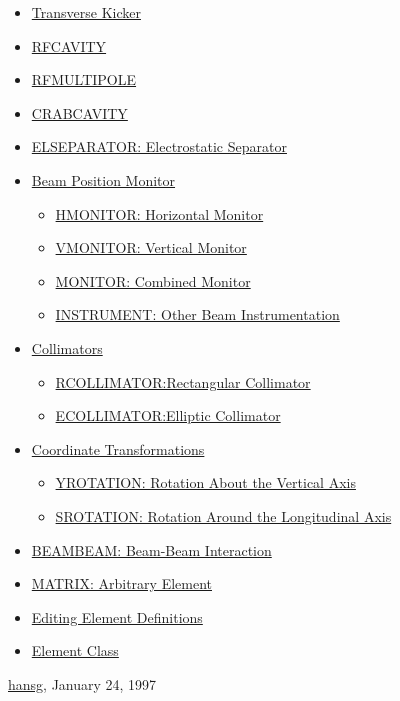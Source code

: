 \begin{itemize}
\begin{itemize}
\end{itemize}
	\item \href{tkickers.html}{Transverse Kicker}
	\item \href{cavity.html}{RFCAVITY}
	\item \href{rfmultipole.html}{RFMULTIPOLE}
	\item \href{crabcavity.html}{CRABCAVITY}
	\item \href{separator.html}{ELSEPARATOR: Electrostatic Separator}
	\item \href{monitors.html}{Beam Position Monitor}
\begin{itemize}
	\item \href{monitors.html#hmon}{HMONITOR: Horizontal Monitor}
	\item \href{monitors.html#vmon}{VMONITOR: Vertical Monitor}
	\item \href{monitors.html#mon}{MONITOR: Combined Monitor}
	\item \href{monitors.html#inst}{INSTRUMENT: Other Beam Instrumentation}
\end{itemize}
	\item \href{collimator.html}{Collimators}
\begin{itemize}
	\item \href{collimator.html#rcol}{RCOLLIMATOR:Rectangular Collimator}
	\item \href{collimator.html#ecol}{ECOLLIMATOR:Elliptic Collimator}
\end{itemize}
	\item \href{rotation.html}{Coordinate Transformations}
\begin{itemize}
	\item \href{rotation.html#yrotation}{YROTATION: Rotation About the Vertical Axis}
	\item \href{rotation.html#srotation}{SROTATION: Rotation Around the Longitudinal Axis}
\end{itemize}
	\item \href{beambeam.html}{BEAMBEAM: Beam-Beam Interaction}
	\item \href{matrix.html}{MATRIX: Arbitrary Element}
	\item \href{elm_edit.html}{Editing Element Definitions}
	\item \href{elm_class.html}{Element Class}
\end{itemize}

\href{http://www.cern.ch/Hans.Grote/hansg_sign.html}{hansg}, January 24, 1997 


